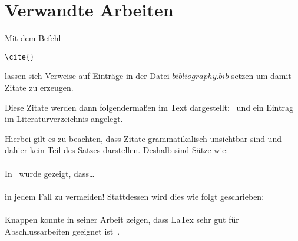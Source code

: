 
\chapter{Verwandte Arbeiten}
\label{ch:verwandte-arbeiten}

Mit dem Befehl
\begin{verbatim}
\cite{}
\end{verbatim}

lassen sich Verweise auf Einträge in der Datei $bibliography.bib$ setzen um damit Zitate zu erzeugen.

Diese Zitate werden dann folgendermaßen im Text dargestellt:~\cite{kopka} und ein Eintrag im Literaturverzeichnis angelegt.

Hierbei gilt es zu beachten, dass Zitate grammatikalisch unsichtbar sind und dahier kein Teil des Satzes darstellen.
Deshalb sind Sätze wie:
\\
\\
In~\cite{Knappen2009} wurde gezeigt, dass\ldots
\\
\\
in jedem Fall zu vermeiden!
Stattdessen wird dies wie folgt geschrieben:
\\
\\
Knappen konnte in seiner Arbeit zeigen, dass LaTex sehr gut für Abschlussarbeiten geeignet ist~\cite{Knappen2009}.
